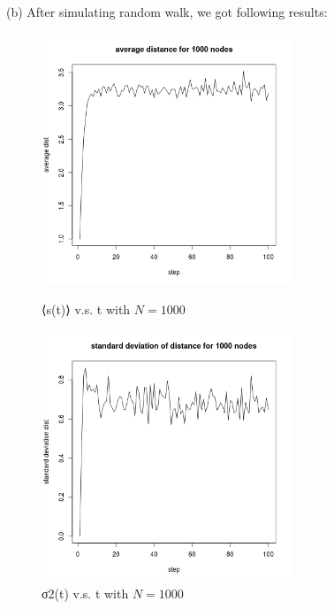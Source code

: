 \documentclass[draftcls,12pt,onecolumn]{IEEEtran}
\begin{document}
(b) After simulating random walk, we got following results:
\begin{figure}[htbp]
\centering
\begin{minipage}[t]{0.48\textwidth}
\centering
\includegraphics[width=7.5cm]{2_1_b_distance.png}
\caption{⟨s(t)⟩ v.s. t with $N = 1000$}
\label{fig01}
\end{minipage}
\begin{minipage}[t]{0.48\textwidth}
\centering
\includegraphics[width=7.5cm]{2_1_b_deviation.png}
\caption{σ2(t) v.s. t with $N = 1000$}
\label{fig02}
\end{minipage}
\end{figure}
\end{document}
